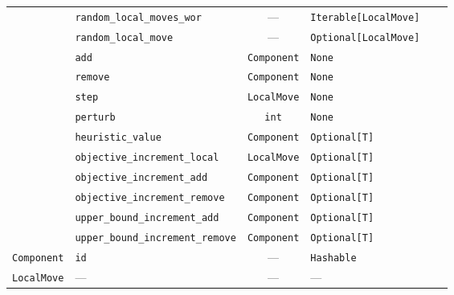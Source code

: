 \begin{adjustbox}{max width=\textwidth}
\begin{tabular}{@{}llcp{4cm}cp{4cm}@{}}
                                        & \texttt{random\_local\_moves\_wor}       & ---                & \texttt{Iterable[LocalMove]} \\
                                        & \texttt{random\_local\_move}             & ---                & \texttt{Optional[LocalMove]} \\
                                        & \texttt{add}                             & \texttt{Component} & \texttt{None}                \\
                                        & \texttt{remove}                          & \texttt{Component} & \texttt{None}                \\
                                        & \texttt{step}                            & \texttt{LocalMove} & \texttt{None}                \\
                                        & \texttt{perturb}                         & \texttt{int}       & \texttt{None}                \\
                                        & \texttt{heuristic\_value}                & \texttt{Component} & \texttt{Optional[T]}         \\
                                        & \texttt{objective\_increment\_local}     & \texttt{LocalMove} & \texttt{Optional[T]}         \\
                                        & \texttt{objective\_increment\_add}       & \texttt{Component} & \texttt{Optional[T]}         \\
                                        & \texttt{objective\_increment\_remove}    & \texttt{Component} & \texttt{Optional[T]}         \\
                                        & \texttt{upper\_bound\_increment\_add}    & \texttt{Component} & \texttt{Optional[T]}         \\
                                        & \texttt{upper\_bound\_increment\_remove} & \texttt{Component} & \texttt{Optional[T]}         \\
    \midrule
    \multirow{1}{*}{\texttt{Component}} & \texttt{id}                              & ---                & \texttt{Hashable}            \\
    \midrule
    \multirow{1}{*}{\texttt{LocalMove}} & ---                                      & ---                & ---                          \\
    \bottomrule
  \end{tabular}
\end{adjustbox}